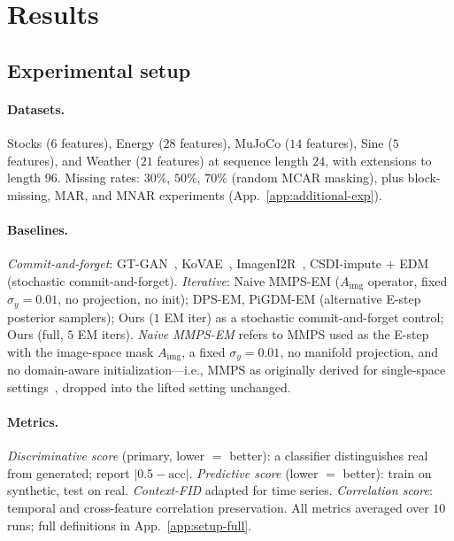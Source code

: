 \documentclass{article}
\theoremstyle{plain}
\theoremstyle{definition}
\theoremstyle{remark}
\newcommand{\Aimg}{A_{\mathrm{img}}}
\begin{document}
\vspace{-2mm}
\section{Results}
\label{sec:results}
\vspace{-1mm}

\subsection{Experimental setup}
\label{sec:setup}
\vspace{-1mm}

\paragraph{Datasets.}
Stocks ($6$ features), Energy ($28$ features), MuJoCo ($14$ features), Sine ($5$ features), and Weather ($21$ features) at sequence length $24$, with extensions to length $96$. Missing rates: $30\%$, $50\%$, $70\%$ (random MCAR masking), plus block-missing, MAR, and MNAR experiments (App.~\ref{app:additional-exp}).

\paragraph{Baselines.}
\emph{Commit-and-forget}: GT-GAN~\citep{jeon2022gtgan}, KoVAE~\citep{naiman2024kovae}, ImagenI2R~\citep{fadlon2025imageni2r}, CSDI-impute $+$ EDM~\citep{tashiro2021csdi,karras2022edm} (stochastic commit-and-forget).
\emph{Iterative}: Naive MMPS-EM ($\Aimg$ operator, fixed $\sigma_y = 0.01$, no projection, no init); DPS-EM, PiGDM-EM (alternative E-step posterior samplers); Ours ($1$ EM iter) as a stochastic commit-and-forget control; Ours (full, $5$ EM iters). \emph{Naive MMPS-EM} refers to MMPS used as the E-step with the image-space mask $\Aimg$, a fixed $\sigma_y = 0.01$, no manifold projection, and no domain-aware initialization---i.e., MMPS as originally derived for single-space settings~\citep{rozet2024diem}, dropped into the lifted setting unchanged.

\paragraph{Metrics.}
\emph{Discriminative score} (primary, lower $=$ better): a classifier distinguishes real from generated; report $|0.5 - \mathrm{acc}|$. \emph{Predictive score} (lower $=$ better): train on synthetic, test on real. \emph{Context-FID} adapted for time series. \emph{Correlation score}: temporal and cross-feature correlation preservation. All metrics averaged over $10$ runs; full definitions in App.~\ref{app:setup-full}.
\end{document}
